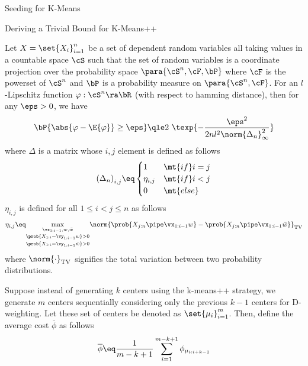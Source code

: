 \documentclass[10pt]{article}
\begin{document}
\begin{psection}{Seeding for K-Means}
\begin{psubsection}{Deriving a Trivial Bound for K-Means++}
        \begin{theorem}
            Let $X = \set{X_i}_{i = 1}^n$ be a set of dependent random variables all taking
            values in a countable space $\cS$ such that the set of random variables is a
            coordinate projection over the probability space $\para{\cS^n, \cF, \bP}$ where
            $\cF$ is the powerset of $\cS^n$ and $\bP$ is a probability measure on
            $\para{\cS^n, \cF}$. For an $l$-Lipschitz function $\varphi : \cS^n \ra \bR$
            (with respect to hamming distance), then for any $\eps > 0$, we have
            \begin{align*}
                \bP\{\abs{\varphi - \E{\varphi}} \ge \eps\} \qle 2\ \texp{-\frac{\eps^2}{2 n l^2 \norm{\Delta_n}_\infty^2}}
            \end{align*}
            where $\Delta$ is a matrix whose $i,j$ element is defined as follows
            \begin{align*}
                {(\Delta_n)}_{i, j} \eq \begin{cases}
                    1 & \mt{if} i = j \\
                    \eta_{i, j} & \mt{if} i < j \\
                    0 & \mt{else}
                \end{cases}
            \end{align*}
            $\eta_{i, j}$ is defined for all $1 \le i < j \le n$  as follows
            \begin{align*}
                \eta_{i, j} \eq \underset{\prob{X_{1:i} = \vy_{1:i-1}\bar{w}} > 0}{\underset{\prob{X_{1:i} = \vy_{1:i-1}w} > 0}{\max_{\vx_{1:i-1}, w, \bar{w}}}} \norm{\prob{X_{j:n} \pipe \vx_{1:i-1} w} - \prob{X_{j:n} \pipe \vx_{1:i-1} \bar{w}}}_{\text{TV}}
            \end{align*}
            where $\norm{\cdot}_{\text{TV}}$ signifies the total variation between two
            probability distributions.
        \end{theorem}

        Suppose instead of generating $k$ centers using the k-means++ strategy, we
        generate $m$ centers sequentially considering only the previous $k-1$
        centers for D-weighting. Let these set of centers be denoted as
        $\set{\mu_i}_{i=1}^m$. Then, define the average cost $\overline{\phi}$ as
        follows
        \begin{align}
            \label{eq:phi-bar}
            \overline{\phi} \eq \frac{1}{m-k+1} \sum_{i=1}^{m-k+1} \phi_{\mu_{i:i+k-1}}
        \end{align}


\end{psubsection}
\end{psection}
\end{document}
